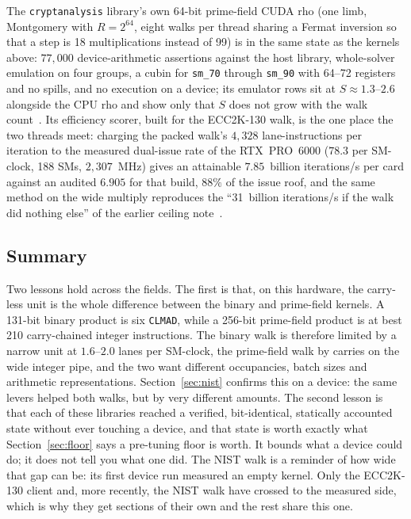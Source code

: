 The \texttt{cryptanalysis} library's own 64-bit prime-field CUDA rho (one limb, Montgomery
with $R=2^{64}$, eight walks per thread sharing a Fermat inversion so
that a step is 18 multiplications instead of 99) is in the same
state as the kernels above: $77{,}000$ device-arithmetic assertions
against the host library, whole-solver emulation on four groups, a
cubin for \texttt{sm\_70} through \texttt{sm\_90} with 64--72 registers
and no spills, and no execution on a device; its emulator rows sit at
$S\approx1.3$--$2.6$ alongside the CPU rho and show only that $S$ does
not grow with the walk count~.
Its efficiency scorer, built for the ECC2K-130 walk, is the one place
the two threads meet: charging the packed walk's $4{,}328$
lane-instructions per iteration to the measured dual-issue rate of
the RTX~PRO~6000 ($78.3$ per SM-clock, 188 SMs, $2{,}307$~MHz) gives
an attainable $7.85$~billion iterations/s per card against an audited $6.905$ for that
build, $88\%$ of the issue roof, and the same method on the wide
multiply reproduces the ``31~billion iterations/s if the walk did nothing else''
of the earlier ceiling note~.

\subsection{Summary}

Two lessons hold across the fields. The first is that, on this
hardware, the carry-less unit is the whole difference between the
binary and prime-field kernels. A 131-bit binary product is six
\texttt{CLMAD}, while a 256-bit prime-field product is at best 210
carry-chained integer instructions. The binary walk is therefore
limited by a narrow unit at $1.6$--$2.0$ lanes per SM-clock, the
prime-field walk by carries on the wide integer pipe, and the two want
different occupancies, batch sizes and arithmetic representations.
Section~\ref{sec:nist} confirms this on a device: the same levers
helped both walks, but by very different amounts. The second lesson is
that each of these libraries reached a verified, bit-identical,
statically accounted state without ever touching a device, and that
state is worth exactly what Section~\ref{sec:floor} says a pre-tuning
floor is worth. It bounds what a device could do; it does not tell you
what one did. The NIST walk is a reminder of how wide that gap can be:
its first device run measured an empty kernel. Only the ECC2K-130
client and, more recently, the NIST walk have crossed to the measured
side, which is why they get sections of their own and the rest share
this one.
